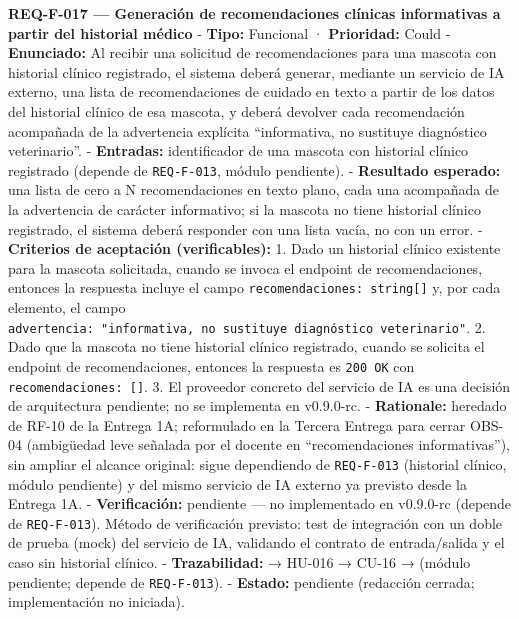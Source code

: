 \documentclass[
]{article}
\begin{document}
\textbf{REQ-F-017 --- Generación de recomendaciones clínicas
informativas a partir del historial médico} - \textbf{Tipo:} Funcional ·
\textbf{Prioridad:} Could - \textbf{Enunciado:} Al recibir una solicitud
de recomendaciones para una mascota con historial clínico registrado, el
sistema deberá generar, mediante un servicio de IA externo, una lista de
recomendaciones de cuidado en texto a partir de los datos del historial
clínico de esa mascota, y deberá devolver cada recomendación acompañada
de la advertencia explícita ``informativa, no sustituye diagnóstico
veterinario''. - \textbf{Entradas:} identificador de una mascota con
historial clínico registrado (depende de \texttt{REQ-F-013}, módulo
pendiente). - \textbf{Resultado esperado:} una lista de cero a N
recomendaciones en texto plano, cada una acompañada de la advertencia de
carácter informativo; si la mascota no tiene historial clínico
registrado, el sistema deberá responder con una lista vacía, no con un
error. - \textbf{Criterios de aceptación (verificables):} 1. Dado un
historial clínico existente para la mascota solicitada, cuando se invoca
el endpoint de recomendaciones, entonces la respuesta incluye el campo
\texttt{recomendaciones:\ string{[}{]}} y, por cada elemento, el campo
\texttt{advertencia:\ "informativa,\ no\ sustituye\ diagnóstico\ veterinario"}.
2. Dado que la mascota no tiene historial clínico registrado, cuando se
solicita el endpoint de recomendaciones, entonces la respuesta es
\texttt{200\ OK} con \texttt{recomendaciones:\ {[}{]}}. 3. El proveedor
concreto del servicio de IA es una decisión de arquitectura pendiente;
no se implementa en v0.9.0-rc. - \textbf{Rationale:} heredado de RF-10
de la Entrega 1A; reformulado en la Tercera Entrega para cerrar OBS-04
(ambigüedad leve señalada por el docente en ``recomendaciones
informativas''), sin ampliar el alcance original: sigue dependiendo de
\texttt{REQ-F-013} (historial clínico, módulo pendiente) y del mismo
servicio de IA externo ya previsto desde la Entrega 1A. -
\textbf{Verificación:} pendiente --- no implementado en v0.9.0-rc
(depende de \texttt{REQ-F-013}). Método de verificación previsto: test
de integración con un doble de prueba (mock) del servicio de IA,
validando el contrato de entrada/salida y el caso sin historial clínico.
- \textbf{Trazabilidad:} → HU-016 → CU-16 → (módulo pendiente; depende
de \texttt{REQ-F-013}). - \textbf{Estado:} pendiente (redacción cerrada;
implementación no iniciada).
\end{document}
